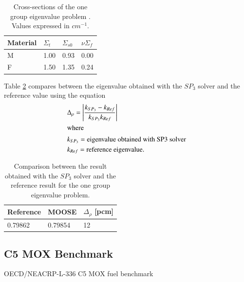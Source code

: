 \documentclass{anstrans}
\begin{document}
\begin{table}[htbp!]
	\centering
	\caption{Cross-sections of the one group eigenvalue problem \cite{brantley_simplifiedP3_2000}. Values expressed in $cm^{-1}$.}
	\label{tab:cross-sections}
	\begin{tabular}{llll}
	\toprule
	Material	& $\Sigma_t$ & $\Sigma_{s0}$ & $\nu\Sigma_f$ \\
	\midrule
	M 			& 1.00		& 0.93			& 0.00			\\
	F 			& 1.50		& 1.35			& 0.24			\\
	\bottomrule
	\end{tabular}
\end{table}

Table \ref{tab:keff-1st} compares between the eigenvalue obtained with the $SP_3$ solver and the reference value \cite{brantley_simplifiedP3_2000} using the equation
\begin{align}
  & \Delta_\rho = \left| \frac{k_{SP_3}-k_{Ref}}{k_{SP_3} k_{Ref}} \right| \label{eq:delta-rho} \\
  \intertext{where}
  & k_{SP_3} = \mbox{eigenvalue obtained with SP3 solver} \notag \\
  & k_{Ref} = \mbox{reference eigenvalue.} \notag
\end{align}

\begin{table}[htbp!]
	\centering
	\caption{Comparison between the result obtained with the $SP_3$ solver and the reference result for the one group eigenvalue problem.}
	\label{tab:keff-1st}
	\begin{tabular}{lll}
	\toprule
		Reference	& MOOSE 	& $\Delta_{\rho}$ [pcm]	\\
	\midrule
	 	0.79862		& 0.79854	& 12					\\
	\bottomrule
	\end{tabular}
\end{table}

\subsection{C5 MOX Benchmark}
\label{sec:results-2nd}

OECD/NEACRP-L-336 C5 MOX fuel benchmark \cite{cavarec_benchmark_1994}
\end{document}
